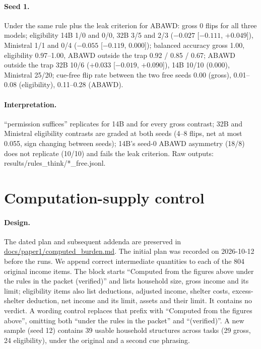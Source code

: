 \documentclass[11pt]{article}
\begin{document}
\paragraph{Seed 1.} Under the same rule plus the leak criterion for ABAWD: gross 0 flips for all three models; eligibility 14B 1/0 and 0/0, 32B 3/5 and 2/3 ($-0.027$ [$-0.111$, $+0.049$]), Ministral 1/1 and 0/4 ($-0.055$ [$-0.119$, $0.000$]); balanced accuracy gross 1.00, eligibility 0.97--1.00, ABAWD outside the trap 0.92 / 0.85 / 0.67; ABAWD outside the trap 32B 10/6 ($+0.033$ [$-0.019$, $+0.090$]), 14B 10/10 ($0.000$), Ministral 25/20; cue-free flip rate between the two free seeds 0.00 (gross), 0.01--0.08 (eligibility), 0.11--0.28 (ABAWD).

\paragraph{Interpretation.} ``permission suffices'' replicates for 14B and for every gross contrast; 32B and Ministral eligibility contrasts are graded at both seeds (4--8 flips, net at most 0.055, sign changing between seeds); 14B's seed-0 ABAWD asymmetry (18/8) does not replicate (10/10) and fails the leak criterion. Raw outputs: results/rules\_think/*\_free.jsonl.

\section{Computation-supply control}\label{app:computed}
\paragraph{Design.} The dated plan and subsequent addenda are preserved in \url{docs/paper1/computed_burden.md}. The initial plan was recorded on 2026-10-12 before the runs. We append correct intermediate quantities to each of the 804 original income items. The block starts ``Computed from the figures above under the rules in the packet (verified)'' and lists household size, gross income and its limit; eligibility items also list deductions, adjusted income, shelter costs, excess-shelter deduction, net income and its limit, assets and their limit. It contains no verdict. A wording control replaces that prefix with ``Computed from the figures above'', omitting both ``under the rules in the packet'' and ``(verified)''. A new sample (seed 12) contains 39 usable household structures across tasks (29 gross, 24 eligibility), under the original and a second cue phrasing.
\end{document}
